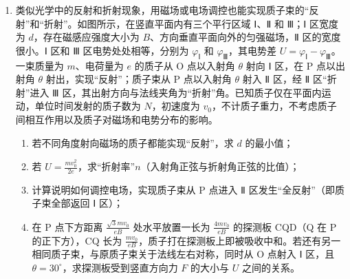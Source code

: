 \documentclass[\gkver]{gaokaozhenti}
\begin{document}
\begin{enumerate}
{（3）由能量守恒定律可得平台在 $0\sim t_{1}$ 时间内，振动时能量的减少
$Q' = \frac{1}{2}mv_{0}^{2} - \frac{1}{2}kA_{1}^{2}$
在 $0\sim t_{1}$ 时间内，振动时能量的减少转化为线圈的焦耳热，可知每个线圈产生的焦耳热
$Q = \frac{1}{3}Q' = \frac{1}{6}(mv_{0}^{2} - kA_{1}^{2})$

（4）设向上为正方向，对全过程列动量定理可得
$I_{\text{弹}} + I_{A} - I_{G} = 0$
其中 $I_{G} = mg(t_{2} - t_{1})$
$I_{A} = F_{A}t = 3\times\sum\frac{4vr^{2}\pi^{2}B^{2}}{R}\Delta t = \frac{12r^{2}\pi^{2}B^{2}}{R}\sum v\Delta t = \frac{12r^{2}\pi^{2}B^{2}}{R}\Delta x = \frac{12r^{2}\pi^{2}B^{2}}{R}(A_{1} - A_{2})$
联立解得弹簧弹力冲量 $I_{\text{弹}}$ 的大小为
$I_{\text{弹}} = mg(t_{2} - t_{1}) - \frac{12r^{2}\pi^{2}B^{2}(A_{1} - A_{2})}{R}$
}

\item
类似光学中的反射和折射现象，用磁场或电场调控也能实现质子束的“反射”和“折射”。如图所示，在竖直平面内有三个平行区域 Ⅰ、Ⅱ 和 Ⅲ；Ⅰ 区宽度为 $d$，存在磁感应强度大小为 $B$、方向垂直平面向外的匀强磁场，Ⅱ 区的宽度很小。Ⅰ 区和 Ⅲ 区电势处处相等，分别为 $\varphi_{\text{Ⅰ}}$ 和 $\varphi_{\text{Ⅲ}}$，其电势差 $U = \varphi_{\text{Ⅰ}} - \varphi_{\text{Ⅲ}}$。一束质量为 $m$、电荷量为 $e$ 的质子从 O 点以入射角 $\theta$ 射向 Ⅰ 区，在 P 点以出射角 $\theta$ 射出，实现“反射”；质子束从 P 点以入射角 $\theta$ 射入 Ⅱ 区，经 Ⅱ 区“折射”进入 Ⅲ 区，其出射方向与法线夹角为“折射”角。已知质子仅在平面内运动，单位时间发射的质子数为 $N$，初速度为 $v_{0}$，不计质子重力，不考虑质子间相互作用以及质子对磁场和电势分布的影响。

\begin{enumerate}
	\item
	若不同角度射向磁场的质子都能实现“反射”，求 $d$ 的最小值；
	\item
	若 $U = \frac{mv_{0}^{2}}{2e}$，求“折射率”$n$（入射角正弦与折射角正弦的比值）；
	\item
	计算说明如何调控电场，实现质子束从 P 点进入 Ⅱ 区发生“全反射”（即质子束全部返回 Ⅰ 区）；
	\item
	在 P 点下方距离 $\frac{\sqrt{3}mv_{0}}{eB}$ 处水平放置一长为 $\frac{4mv_{0}}{eB}$ 的探测板 CQD（Q 在 P 的正下方），CQ 长为 $\frac{mv_{0}}{eB}$，质子打在探测板上即被吸收中和。若还有另一相同质子束，与原质子束关于法线左右对称，同时从 O 点射入 Ⅰ 区，且 $\theta = 30^\circ$，求探测板受到竖直方向力 $F$ 的大小与 $U$ 之间的关系。
\end{enumerate}
\end{enumerate}
\end{document}
